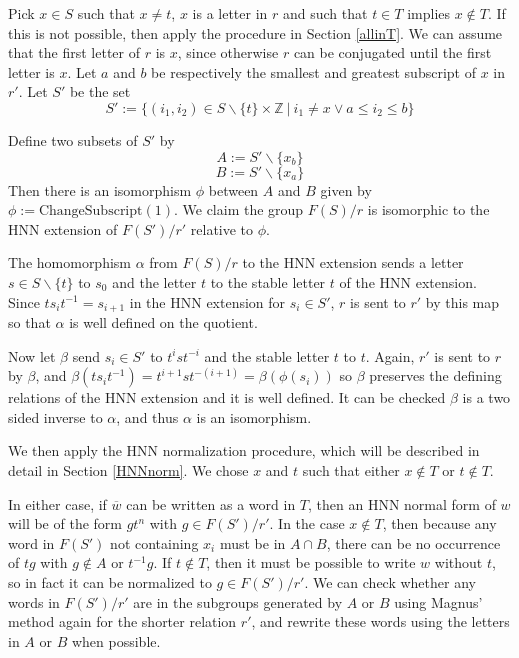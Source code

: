\documentclass[11pt]{article} %
\theoremstyle{definition}
\theoremstyle{definition}
\theoremstyle{definition}
\theoremstyle{definition}
\theoremstyle{definition}
\theoremstyle{definition}
\begin{document}
Pick $x \in S$ such that $x \ne t$,
  $x$ is a letter in $r$ and such that $t \in T$ implies $x \notin T$.
  If this is not possible, then apply the procedure in Section \ref{allinT}.
  We can assume that the first letter of $r$ is
$x$, since otherwise $r$ can be conjugated until the first letter is $x$.
Let $a$ and $b$ be respectively the
smallest and greatest subscript of $x$ in $r'$. Let $S'$ be the set
\begin{equation}
S' := \{(i_1, i_2) \in S \backslash \{t\} \times \mathbb{Z} \
| \ i_1 \ne x \vee a \le i_2 \le b \}
\end{equation}

Define two subsets of $S'$ by
\begin{equation}
  A := S' \backslash \{x_b\}
\end{equation}
\begin{equation}
  B := S' \backslash \{x_a\}
\end{equation}
Then there is an isomorphism $\phi$ between $A$ and $B$ given by
$\phi := \text{ChangeSubscript}(1)$.
We claim the group $F(S) / r$ is isomorphic to the HNN extension of $F(S') / r'$ relative to $\phi$.

The homomorphism $\alpha$ from $F(S)/r$ to the HNN extension sends a letter
$s \in S \backslash \{t\}$ to $s_0$ and
the letter $t$ to the stable letter $t$ of the HNN extension. Since $t s_i t^{-1} = s_{i+1}$ in
the HNN extension for $s_i \in S'$, $r$ is sent to $r'$ by this map so that $\alpha$ is well defined
on the quotient.

Now let $\beta$ send $s_i \in S'$ to $t^{i} s t^{-i}$ and the stable letter $t$ to $t$.
Again, $r'$ is sent to $r$ by $\beta$, and $\beta (t s_i t^{-1}) = t^{i+1} s t^{-(i+1)} =
\beta (\phi (s_i))$ so $\beta$ preserves the defining relations of the HNN extension and it
is well defined. It can be checked $\beta$ is a two sided inverse to $\alpha$, and thus $\alpha$
is an isomorphism.

We then apply the HNN normalization procedure, which will be described in detail in Section
\ref{HNNnorm}. We chose $x$ and $t$ such that either $x \notin T$ or $t \notin T$.

In either case, if $\overline{w}$ can be written as a word in $T$,
then an HNN normal form of $w$ will be of the form $g t^n$
with $g \in F(S') / r'$. In the case $x \notin T$, then because any word in
$F(S')$ not containing $x_i$ must be in $A \cap B$, there can be no occurrence of
$tg$ with $g \notin A$ or $t^{-1}g.$
If $t \notin T$, then it must be possible to write $w$ without $t$, so in fact it can be normalized
to $g \in F(S') / r'$. We can check whether any words in $F(S') / r'$ are in the subgroups
generated by $A$ or $B$ using
Magnus' method again for the shorter relation $r'$, and rewrite these words using the letters
in $A$ or $B$ when possible.
\end{document}
